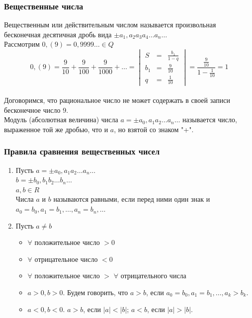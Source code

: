 \documentclass[12pt]{article}
\begin{document}
    \subsubsection*{Вещественные числа}
    \noindent Вещественным или действительным числом называется произвольная бесконечная десятичная дробь вида $\pm a_{1},a_{2}a_{3}a_{4}\dots a_{n} \dots$\\
    Рассмотрим $0,(9) = 0,9999\dots \in Q$\\
    \[0,(9) = \frac{9}{10} + \frac{9}{100} + \frac{9}{1000} + \dots = \begin{vmatrix}
        S & = & \frac{b_{1}}{1-q}\\
        b_{1} & = & \frac{9}{10}\\
        q & = & \frac{1}{10}
    \end{vmatrix} = \frac{\frac{9}{10}}{1-\frac{1}{10}} = 1\]\\
    Договоримся, что рациональное число не может содержать в своей записи бесконечное число 9.\\
    Модуль (абсолютная величина) числа $a = \pm a_{0},a_{1}a_{2}\dots a_{n}\dots$ называется число, выраженное той же дробью, что и $a$, но взятой со знаком "+".
    \subsubsection*{Правила сравнения вещественных чисел}
    \begin{enumerate}
        \item Пусть $a = \pm a_{0},a_{1}a_{2}\dots a_{n}\dots$\\
        $b = \pm b_{0},b_{1}b_{2}\dots b_{n}\dots$\\
        $a,b \in R$\\
        Числа $a$ и $b$ называются равными, если перед ними один знак и $a_{0} = b_{0}, a_{1} = b_{1}, \dots, a_{n} = b_{n}, \dots$
        \item Пусть $a \ne b$
        \begin{itemize}
            \item $\forall$ положительное число $> 0$
            \item $\forall$ отрицательное число $< 0$
            \item $\forall$ положительное число $>$ $\forall$ отрицательного числа
            \item $a > 0, b > 0$. Будем говорить, что $a > b$, если $a_{0}=b_{0}, a_{1}=b_{1},\dots,a_{k}>b_{k}$.
            \item $a < 0, b < 0$. $a > b$, если $|a| < |b|$; $a < b$, если $|a| > |b|$.
        \end{itemize}
    \end{enumerate}
\end{document}
